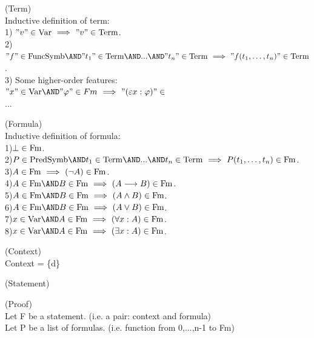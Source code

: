 \begin{definition}(Term)\\
Inductive definition of term:\\
1) $"v"\in\mathrm{Var} \ \Longrightarrow\  "v"\in\mathrm{Term}$.\\
2) 
$"f"\in\FuncSymb\AND "t_1"\in\Term \AND ...\AND "t_n"\in\Term  \IMPLIES "f(t_1,\dots,t_n)"\in\Term$.\\
3) Some higher-order features:\\
$"x"\in\Var\AND"\varphi"\in Fm \IMPLIES "(\varepsilon x : \varphi)"\in $\\
...

\end{definition}

\begin{definition}(Formula)\\
Inductive definition of formula:\\
1)$\bot\in\mathrm{Fm}$.\\
2)$P\in\PredSymb\AND t_1\in\Term \AND ...\AND t_n\in\Term  \IMPLIES P(t_1,\dots,t_n)\in\Fm$.\\
3)$A\in\mathrm{Fm} \ \Longrightarrow\  (\neg A)\in\mathrm{Fm}$.\\
4)$A\in\Fm \AND B\in\Fm \IMPLIES (A\implies B)\in\Fm$.\\
5)$A\in\Fm \AND B\in\Fm \IMPLIES (A\land B)\in\Fm$.\\
6)$A\in\Fm \AND B\in\Fm \IMPLIES (A\lor B)\in\Fm$.\\
7)$x\in\Var \AND A\in\Fm \IMPLIES (\forall x:A)\in\Fm$.\\
8)$x\in\Var \AND A\in\Fm \IMPLIES (\exists x:A)\in\Fm$.\\
\end{definition}

\begin{definition}(Context)\\
Context = \{d\}
\end{definition}

\begin{definition}(Statement)\\
\end{definition}

\begin{definition}(Proof)\\
Let F be a statement. (i.e. a pair: context and formula)\\
Let P be a list of formulas. (i.e. function from {0,...,n-1} to Fm)\\

\end{definition}



